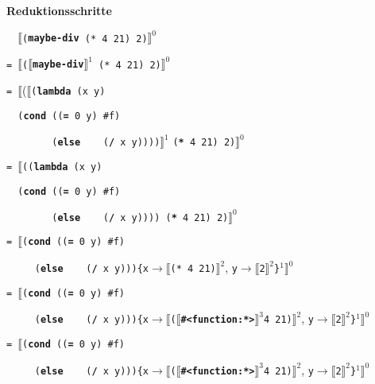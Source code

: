 \begin{center}
	\bfseries
	Reduktionsschritte
\end{center}

\footnotesize
\newcommand{\reduce}[2]{$\llbracket$\texttt{#1}$\rrbracket^#2$}
\newcommand{\accentcolor}{blue}
\newcommand{\highlighter}[1]{\textcolor{\accentcolor}{#1}}

\centering
\begin{minipage}{.8\linewidth}
	\footnotesize
	\noindent\texttt{\ \ }\reduce{{(\textbf{maybe-div} (* 4 21) 2)}}{0}\hfill{}

	\texttt{= }\reduce{(\reduce{{\textbf{maybe-div}}}{1} (* 4 21) 2)}{0}\hfill{}

	\texttt{= }$\llbracket$($\llbracket$\texttt{(\textbf{lambda} (x y)}\hfill{}

	\quad\texttt{\ \ (\textbf{cond} ((\textbf{=} 0 y)\ \#f)}

	\quad\texttt{\ \ \ \ \ \ \ \ (\textbf{else}\ \ \ \ (\textbf{/} x y))))}$\rrbracket^1$ \texttt{(\textbf{*} 4 21) 2)}$\rrbracket^0$

	\texttt{= }$\llbracket$\texttt{((\textbf{lambda} (x y)}\hfill{}

	\quad\texttt{\ \ (\textbf{cond} ((\textbf{=} 0 y)\ \#f)}

	\quad\texttt{\ \ \ \ \ \ \ \ (\textbf{else}\ \ \ \ (\textbf{/} x y)))) (\textbf{*} 4 21) 2)}$\rrbracket^0$

	\texttt{= }$\llbracket$\texttt{(\textbf{cond} ((\textbf{=} 0 y)\ \#f)}\hfill{}

	\quad\texttt{\ \ \ \ \ (\textbf{else}\ \ \ \ (\textbf{/} x y)))\{x}$\to\llbracket$\texttt{(* 4 21)}$\rrbracket^2$, \texttt{y}$\to\llbracket$\texttt{2}$\rrbracket^2$\texttt{\}}$^1\rrbracket^0$

	\texttt{= }$\llbracket$\texttt{(\textbf{cond} ((\textbf{=} 0 y)\ \#f)}\hfill{}


	\quad\texttt{\ \ \ \ \ (\textbf{else}\ \ \ \ (\textbf{/} x y)))\{x}$\to\llbracket$\texttt{(}$\llbracket$\texttt{\textbf{\#<function:*>}}$\rrbracket^3$\texttt{4 21)}$\rrbracket^2$, \texttt{y}$\to\llbracket$\texttt{2}$\rrbracket^2$\texttt{\}}$^1\rrbracket^0$

	\texttt{= }$\llbracket$\texttt{(\textbf{cond} ((\textbf{=} 0 y)\ \#f)}\hfill{}

	\quad\texttt{\ \ \ \ \ (\textbf{else}\ \ \ \ (\textbf{/} x y)))\{x}$\to\llbracket$\texttt{(}$\llbracket$\texttt{\textbf{\#<function:*>}}$\rrbracket^3$\texttt{4 21)}$\rrbracket^2$, \texttt{y}$\to\llbracket$\texttt{2}$\rrbracket^2$\texttt{\}}$^1\rrbracket^0$


\end{minipage}

